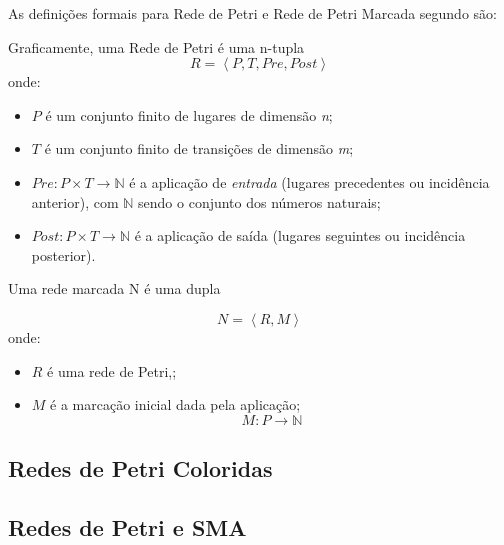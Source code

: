 As definições formais para Rede de Petri e Rede de Petri Marcada segundo \citet{cardoso1997redes} são:

\begin{definition}
\label{drp}
Graficamente, uma Rede de Petri é uma n-tupla
\begin{equation}
R = \left \langle P, T, Pre, Post \right \rangle
\end{equation}
onde:
\begin{itemize}
\item $P$ é um conjunto finito de lugares de dimensão \textit{n};
\item $T$ é um conjunto finito de transições de dimensão \textit{m};
\item $Pre : P \times T \rightarrow \mathbb{N}$   é a aplicação de \textit{entrada} (lugares precedentes ou incidência anterior), com $\mathbb{N}$ sendo o conjunto dos números naturais;
\item $Post : P \times T \rightarrow \mathbb{N}$ é a aplicação de saída (lugares seguintes ou incidência posterior).
\end{itemize}
\end{definition}

\begin{definition}
  \label{drpmarcada}
  Uma rede marcada N é uma dupla

  \begin{equation}
      N = \left \langle R,M \right \rangle
  \end{equation}
  onde:
  \begin{itemize}
  \item $R$ é uma rede de Petri,;
  \item $M$ é a marcação inicial dada pela aplicação;
    \begin{equation}
        M : P \rightarrow \mathbb{N}
    \end{equation}
  \end{itemize}
\end{definition}

\subsection{Redes de Petri Coloridas}

\subsection{Redes de Petri e SMA}

